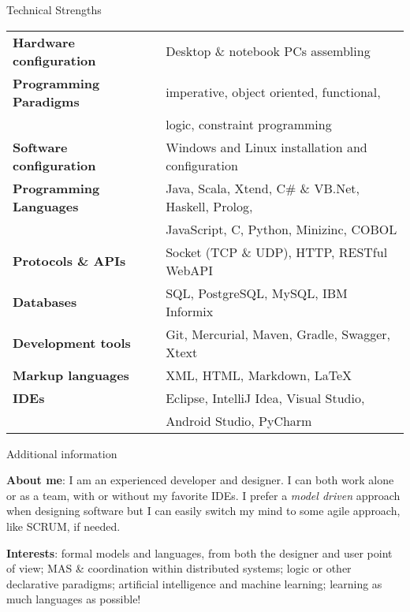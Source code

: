 \documentclass{resume} %
\begin{document}
\clearpage


\begin{rSection}{Technical Strengths}
\begin{tabular}{ @{} >{\bfseries}l @{\hspace{6ex}} l }
Hardware configuration 	& Desktop \& notebook PCs assembling \\
Programming Paradigms	& imperative, object oriented, functional,\\
						& logic, constraint programming\\
Software configuration 	& Windows and Linux installation and configuration\\
Programming Languages 	& Java, Scala, Xtend, C\# \& VB.Net, Haskell, Prolog,\\
						& JavaScript, C, Python, Minizinc, COBOL\\
Protocols \& APIs 		& Socket (TCP \& UDP), HTTP, RESTful WebAPI \\
Databases 				& SQL, PostgreSQL, MySQL, IBM Informix \\
Development tools 		& Git, Mercurial, Maven, Gradle, Swagger, Xtext\\
Markup languages 		& XML, HTML, Markdown, \LaTeX \\
IDEs 					& Eclipse, IntelliJ Idea, Visual Studio, \\
						& Android Studio, PyCharm
\end{tabular}						
\end{rSection}



\begin{rSection}{Additional information}

\item \textbf{About me}: I am an experienced developer and designer. 
I can both work alone or as a team, with or without my favorite IDEs. 
I prefer a \emph{model driven} approach when designing software but I can easily switch my mind to some agile approach, like SCRUM, if needed.

\item \textbf{Interests}: formal models and languages, from both the designer and user point of view; MAS \& coordination within distributed systems; logic or other declarative paradigms; artificial intelligence and machine learning; learning as much languages as possible!
\end{rSection}
\end{document}
